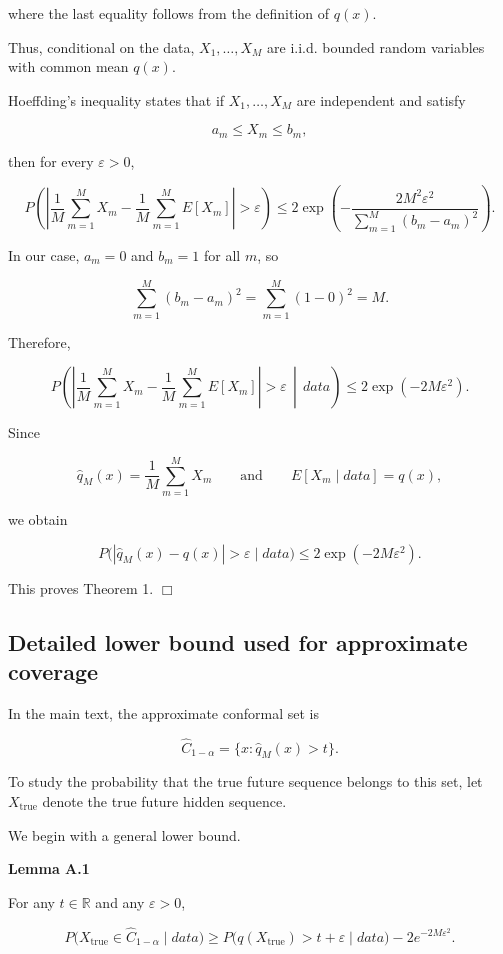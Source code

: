 \documentclass{article}
\begin{document}
where the last equality follows from the definition of $q(x)$.

Thus, conditional on the data, $X_1,\ldots,X_M$ are i.i.d. bounded random variables with common mean $q(x)$.

Hoeffding’s inequality states that if $X_1,\ldots,X_M$ are independent and satisfy

\[
a_m\le X_m\le b_m,
\]

then for every $\varepsilon>0$,

\[
P\!\left(
\left|
\frac{1}{M}\sum_{m=1}^M X_m
-
\frac{1}{M}\sum_{m=1}^M E[X_m]
\right|
>
\varepsilon
\right)
\le
2\exp\!\left(
-\frac{2M^2\varepsilon^2}{\sum_{m=1}^M (b_m-a_m)^2}
\right).
\]

In our case, $a_m=0$ and $b_m=1$ for all $m$, so

\[
\sum_{m=1}^M (b_m-a_m)^2
=
\sum_{m=1}^M (1-0)^2
=
M.
\]

Therefore,

\[
P\!\left(
\left|
\frac{1}{M}\sum_{m=1}^M X_m
-
\frac{1}{M}\sum_{m=1}^M E[X_m]
\right|
>
\varepsilon
\,\middle|\,
data
\right)
\le
2\exp(-2M\varepsilon^2).
\]

Since

\[
\hat{q}_M(x)=\frac{1}{M}\sum_{m=1}^M X_m
\qquad \text{and} \qquad
E[X_m\mid data]=q(x),
\]

we obtain

\[
P\bigl(|\hat{q}_M(x)-q(x)|>\varepsilon \mid data\bigr)
\le
2\exp(-2M\varepsilon^2).
\]

This proves Theorem 1. \hfill $\Box$

\subsection{Detailed lower bound used for approximate coverage}

In the main text, the approximate conformal set is

\[
\hat{C}_{1-\alpha}=\{x:\hat{q}_M(x)>t\}.
\]

To study the probability that the true future sequence belongs to this set, let $X_{\mathrm{true}}$ denote the true future hidden sequence.

We begin with a general lower bound.

\textbf{Lemma A.1}

For any $t\in\mathbb{R}$ and any $\varepsilon>0$,

\[
P\bigl(X_{\mathrm{true}}\in \hat{C}_{1-\alpha}\mid data\bigr)
\ge
P\bigl(q(X_{\mathrm{true}})>t+\varepsilon \mid data\bigr)
-
2e^{-2M\varepsilon^2}.
\]
\end{document}
